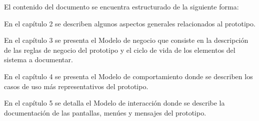 El contenido del documento se encuentra estructurado de la siguiente forma:

\begin{Citemize}
	\item En el capítulo 2  se describen algunos aspectos generales relacionados al prototipo.
	\item En el capítulo 3  se presenta el Modelo de negocio que consiste en la descripción de las reglas de negocio del prototipo y el ciclo de vida de los elementos del sistema a documentar.
	\item En el capítulo 4  se presenta el Modelo de comportamiento donde se describen los casos de uso más representativos del prototipo.
	\item En el capítulo 5  se detalla el Modelo de interacción donde se describe la documentación de las pantallas, menúes y mensajes del prototipo.
\end{Citemize}


